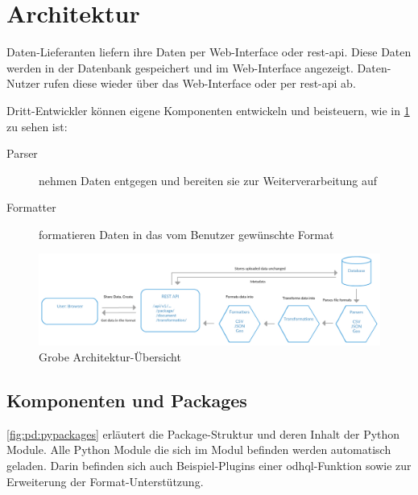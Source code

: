 \section{Architektur}
Daten-Lieferanten liefern ihre Daten per Web-Interface oder \ac{rest}-\ac{api}. Diese Daten werden in der Datenbank gespeichert und im Web-Interface angezeigt. Daten-Nutzer rufen diese wieder über das Web-Interface oder per \ac{rest}-\ac{api} ab. 

Dritt-Entwickler können eigene Komponenten entwickeln und beisteuern, wie in \cref{fig:pd:arch-overview} zu sehen ist:
\begin{description}
\item[Parser] nehmen Daten entgegen und bereiten sie zur Weiterverarbeitung auf
\item[Formatter] formatieren Daten in das vom Benutzer gewünschte Format
\end{description}

\begin{figure}[H]
    \centering
    \includegraphics[width=\linewidth]{fig/ODH-Architecture-Overview}
    \caption{Grobe Architektur-Übersicht}
    \label{fig:pd:arch-overview}
\end{figure}

\subsection{Komponenten und Packages}
\cref{fig:pd:pypackages} erläutert die Package-Struktur und deren Inhalt der Python Module. Alle Python Module die sich im  Modul befinden werden automatisch geladen. Darin befinden sich auch Beispiel-Plugins einer \acs{odhql}-Funktion sowie zur Erweiterung der Format-Unterstützung.

